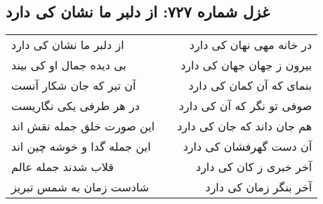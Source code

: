 \begin{center}
\section*{غزل شماره ۷۲۷: از دلبر ما نشان کی دارد}
\label{sec:0727}
\begin{longtable}{l p{0.5cm} r}
از دلبر ما نشان کی دارد
&&
در خانه مهی نهان کی دارد
\\
بی دیده جمال او کی بیند
&&
بیرون ز جهان جهان کی دارد
\\
آن تیر که جان شکار آنست
&&
بنمای که آن کمان کی دارد
\\
در هر طرفی یکی نگاریست
&&
صوفی تو نگر که آن کی دارد
\\
این صورت خلق جمله نقش اند
&&
هم جان داند که جان کی دارد
\\
این جمله گدا و خوشه چین اند
&&
آن دست گهرفشان کی دارد
\\
قلاب شدند جمله عالم
&&
آخر خبری ز کان کی دارد
\\
شادست زمان به شمس تبریز
&&
آخر بنگر زمان کی دارد
\\
\end{longtable}
\end{center}
